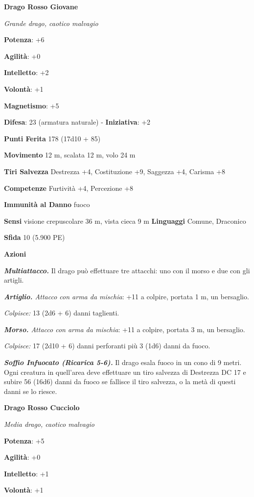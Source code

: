 \begin{multicols}{2}
\textbf{Drago Rosso Giovane}

\emph{Grande drago, caotico malvagio}

\textbf{Potenza}: +6

\textbf{Agilità}: +0

\textbf{Intelletto}: +2

\textbf{Volontà}: +1

\textbf{Magnetismo}: +5

\textbf{Difesa}: 23 (armatura naturale) - \textbf{Iniziativa}: +2

\textbf{Punti Ferita} 178 (17d10 + 85)

\textbf{Movimento} 12 m, scalata 12 m, volo 24 m

\textbf{Tiri Salvezza} Destrezza +4, Costituzione +9, Saggezza +4,
Carisma +8

\textbf{Competenze} Furtività +4, Percezione +8

\textbf{Immunità al Danno} fuoco

\textbf{Sensi} visione crepuscolare 36 m, vista cieca 9 m
\textbf{Linguaggi} Comune, Draconico

\textbf{Sfida} 10 (5.900 PE)\smallskip

\smallskip\textbf{Azioni}

\emph{\textbf{Multiattacco.}} Il drago può effettuare tre attacchi: uno
con il morso e due con gli artigli.

\emph{\textbf{Artiglio.} Attacco con arma da mischia}: +11 a colpire,
portata 1 m, un bersaglio.

\emph{Colpisce:} 13 (2d6 + 6) danni taglienti.

\emph{\textbf{Morso.} Attacco con arma da mischia}: +11 a colpire,
portata 3 m, un bersaglio.

\emph{Colpisce:} 17 (2d10 + 6) danni perforanti più 3 (1d6) danni da
fuoco.

\emph{\textbf{Soffio Infuocato (Ricarica 5-6).}} Il drago esala fuoco in
un cono di 9 metri. Ogni creatura in quell'area deve effettuare un tiro
salvezza di Destrezza DC 17 e subire 56 (16d6) danni da fuoco se
fallisce il tiro salvezza, o la metà di questi danni se lo riesce.

\textbf{Drago Rosso Cucciolo}

\emph{Media drago, caotico malvagio}

\textbf{Potenza}: +5

\textbf{Agilità}: +0

\textbf{Intelletto}: +1

\textbf{Volontà}: +1


\end{multicols}
